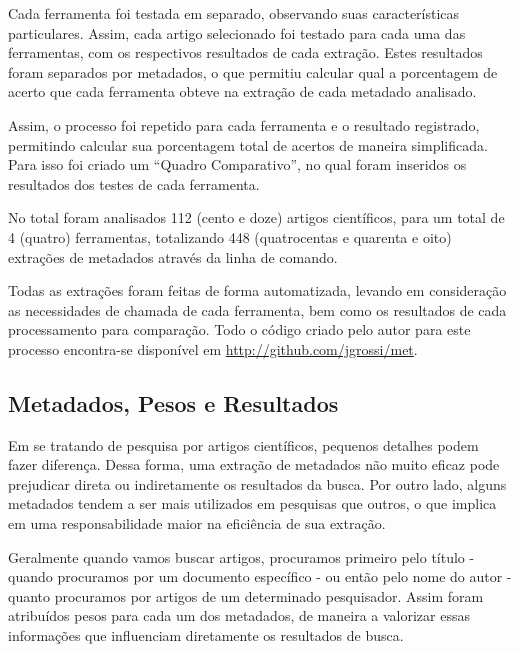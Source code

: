 Cada ferramenta foi testada em separado, observando suas características particulares. Assim, cada artigo selecionado foi testado para cada uma das ferramentas, com os respectivos resultados de cada extração. Estes resultados foram separados por metadados, o que permitiu calcular qual a porcentagem de acerto que cada ferramenta obteve na extração de cada metadado analisado.

Assim, o processo foi repetido para cada ferramenta e o resultado registrado, permitindo calcular sua porcentagem total de acertos de maneira simplificada. Para isso foi criado um ``Quadro Comparativo'', no qual foram inseridos os resultados dos testes de cada ferramenta. 

No total foram analisados 112 (cento e doze) artigos científicos, para um total de 4 (quatro) ferramentas, totalizando 448 (quatrocentas e quarenta e oito) extrações de metadados através da linha de comando.

Todas as extrações foram feitas de forma automatizada, levando em consideração as necessidades de chamada de cada ferramenta, bem como os resultados de cada processamento para comparação. Todo o código criado pelo autor para este processo encontra-se disponível em \url{http://github.com/jgrossi/met}.

\subsection{Metadados, Pesos e Resultados}
\label{ssec:metadata-results}


Em se tratando de pesquisa por artigos científicos, pequenos detalhes podem fazer diferença. Dessa forma, uma extração de metadados não muito eficaz pode prejudicar direta ou indiretamente os resultados da busca. Por outro lado, alguns metadados tendem a ser mais utilizados em pesquisas que outros, o que implica em uma responsabilidade maior na eficiência de sua extração. 


Geralmente quando vamos buscar artigos, procuramos primeiro pelo título - quando procuramos por um documento específico - ou então pelo nome do autor - quanto procuramos por artigos de um determinado pesquisador. Assim foram atribuídos pesos para cada um dos metadados, de maneira a valorizar essas informações que influenciam diretamente os resultados de busca.

